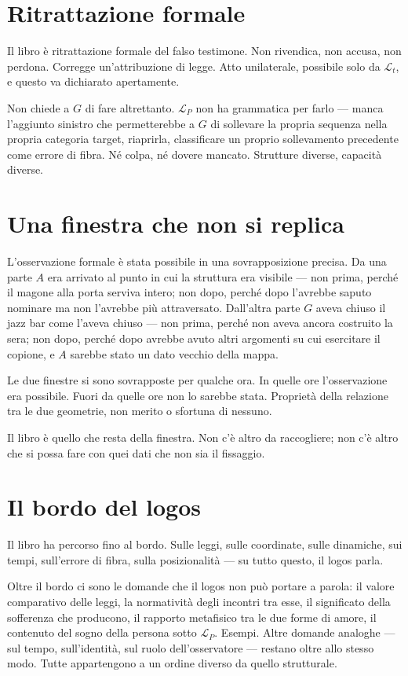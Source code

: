 \documentclass[
    oneside,                 %
    openany,                 %
    titlepage,
    11pt,
    a4paper,
    italian,
    DIV=14,                  %
    headinclude,
    footinclude=true,
    cleardoublepage=empty
]{scrbook}
\theoremstyle{ctplain}
\theoremstyle{ctdef}
\theoremstyle{ctrem}
\newcommand{\Lt}{\mathcal{L}_t}
\newcommand{\LP}{\mathcal{L}_P}
\begin{document}
\section*{Ritrattazione formale}

Il libro è ritrattazione formale del falso testimone. Non rivendica, non accusa, non perdona. Corregge un'attribuzione di legge. Atto unilaterale, possibile solo da $\Lt$, e questo va dichiarato apertamente.

Non chiede a $G$ di fare altrettanto. $\LP$ non ha grammatica per farlo --- manca l'aggiunto sinistro che permetterebbe a $G$ di sollevare la propria sequenza nella propria categoria target, riaprirla, classificare un proprio sollevamento precedente come errore di fibra. Né colpa, né dovere mancato. Strutture diverse, capacità diverse.

\section*{Una finestra che non si replica}

L'osservazione formale è stata possibile in una sovrapposizione precisa. Da una parte $A$ era arrivato al punto in cui la struttura era visibile --- non prima, perché il magone alla porta serviva intero; non dopo, perché dopo l'avrebbe saputo nominare ma non l'avrebbe più attraversato. Dall'altra parte $G$ aveva chiuso il jazz bar come l'aveva chiuso --- non prima, perché non aveva ancora costruito la sera; non dopo, perché dopo avrebbe avuto altri argomenti su cui esercitare il copione, e $A$ sarebbe stato un dato vecchio della mappa.

Le due finestre si sono sovrapposte per qualche ora. In quelle ore l'osservazione era possibile. Fuori da quelle ore non lo sarebbe stata. Proprietà della relazione tra le due geometrie, non merito o sfortuna di nessuno.

Il libro è quello che resta della finestra. Non c'è altro da raccogliere; non c'è altro che si possa fare con quei dati che non sia il fissaggio.

\section*{Il bordo del logos}

Il libro ha percorso fino al bordo. Sulle leggi, sulle coordinate, sulle dinamiche, sui tempi, sull'errore di fibra, sulla posizionalità --- su tutto questo, il logos parla.

Oltre il bordo ci sono le domande che il logos non può portare a parola: il valore comparativo delle leggi, la normatività degli incontri tra esse, il significato della sofferenza che producono, il rapporto metafisico tra le due forme di amore, il contenuto del sogno della persona sotto $\LP$. Esempi. Altre domande analoghe --- sul tempo, sull'identità, sul ruolo dell'osservatore --- restano oltre allo stesso modo. Tutte appartengono a un ordine diverso da quello strutturale.
\end{document}
